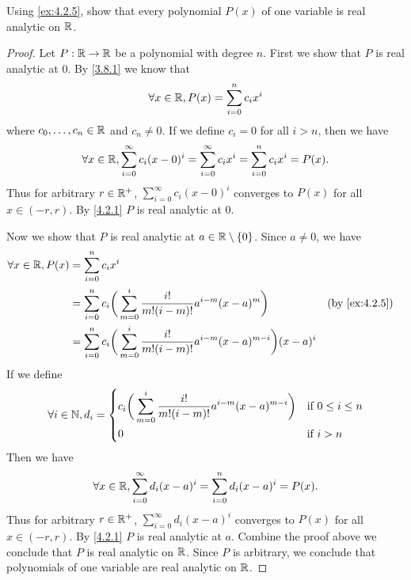 \begin{ex}\label{ex:4.2.6}
  Using \cref{ex:4.2.5}, show that every polynomial \(P(x)\) of one variable is real analytic on \(\mathbb{R}\).
\end{ex}

\begin{proof}
  Let \(P : \mathbb{R} \to \mathbb{R}\) be a polynomial with degree \(n\).
  First we show that \(P\) is real analytic at \(0\).
  By \cref{3.8.1} we know that
  \[
    \forall x \in \mathbb{R}, P(x) = \sum_{i = 0}^n c_i x^i
  \]
  where \(c_0, \dots, c_n \in \mathbb{R}\) and \(c_n \neq 0\).
  If we define \(c_i = 0\) for all \(i > n\), then we have
  \[
    \forall x \in \mathbb{R}, \sum_{i = 0}^\infty c_i (x - 0)^i = \sum_{i = 0}^\infty c_i x^i = \sum_{i = 0}^n c_i x^i = P(x).
  \]
  Thus for arbitrary \(r \in \mathbb{R}^+\), \(\sum_{i = 0}^\infty c_i (x - 0)^i\) converges to \(P(x)\) for all \(x \in (-r, r)\).
  By \cref{4.2.1} \(P\) is real analytic at \(0\).

  Now we show that \(P\) is real analytic at \(a \in \mathbb{R} \setminus \left\lbrace0\right\rbrace\).
  Since \(a \neq 0\), we have
  \begin{align*}
    \forall x \in \R, P(x) & = \sum_{i = 0}^n c_i x^i                                                                                                       \\
                           & = \sum_{i = 0}^n c_i \bigg(\sum_{m = 0}^i \dfrac{i!}{m! (i - m)!} a^{i - m} (x - a)^m\bigg)                 &  & \by{ex:4.2.5} \\
                           & = \sum_{i = 0}^n c_i \bigg(\sum_{m = 0}^i \dfrac{i!}{m! (i - m)!} a^{i - m} (x - a)^{m - i}\bigg) (x - a)^i
  \end{align*}
  If we define
  \[
    \forall i \in \mathbb{N}, d_i = \begin{dcases}
      c_i \bigg(\sum_{m = 0}^i \dfrac{i!}{m! (i - m)!} a^{i - m} (x - a)^{m - i}\bigg) & \text{if } 0 \leq i \leq n \\
      0                                                                                & \text{if } i > n
    \end{dcases}
  \]
  Then we have
  \[
    \forall x \in \mathbb{R}, \sum_{i = 0}^\infty d_i (x - a)^i = \sum_{i = 0}^n d_i (x - a)^i = P(x).
  \]
  Thus for arbitrary \(r \in \mathbb{R}^+\), \(\sum_{i = 0}^\infty d_i (x - a)^i\) converges to \(P(x)\) for all \(x \in (-r, r)\).
  By \cref{4.2.1} \(P\) is real analytic at \(a\).
  Combine the proof above we conclude that \(P\) is real analytic on \(\mathbb{R}\).
  Since \(P\) is arbitrary, we conclude that polynomials of one variable are real analytic on \(\mathbb{R}\).
\end{proof}


